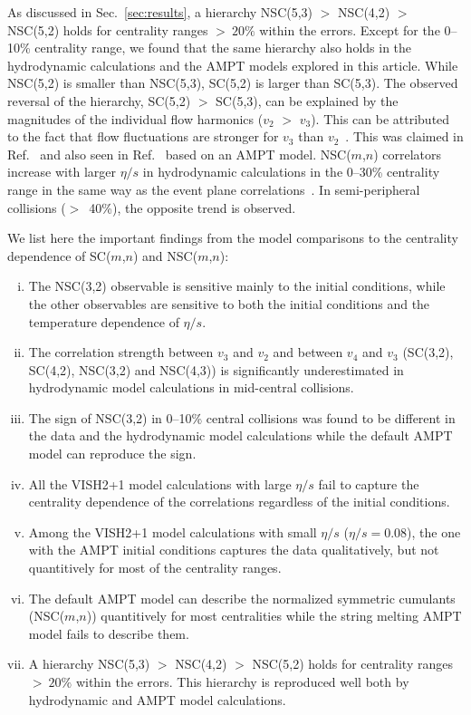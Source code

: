 As discussed in Sec.~\ref{sec:results}, a hierarchy NSC(5,3) $>$ NSC(4,2) $>$ NSC(5,2) holds for centrality ranges $>~20\%$ within the errors.
Except for the 0--10\% centrality range, we found that the same hierarchy also holds in the hydrodynamic calculations and the AMPT models explored in this article.
While NSC(5,2) is smaller than NSC(5,3), SC(5,2) is larger than SC(5,3).
The observed reversal of the hierarchy, SC(5,2) $>$ SC(5,3), can be explained by the magnitudes of the individual flow harmonics ($v_2$ $>$ $v_3$). 
This can be attributed to the fact that flow fluctuations are stronger for $v_3$ than $v_2$~\cite{Aad:2013xma}. This was claimed in Ref.~\cite{Zhu:2016puf} and also seen in Ref.~\cite{Bhalerao:2014xra} based on an AMPT model. 
NSC($m$,$n$) correlators increase with larger $\eta/s$ in hydrodynamic calculations in the 0--30\% centrality range in the same way as the event plane correlations~\cite{Bhalerao:2013ina,Teaney:2013dta}. In semi-peripheral collisions ($>$~40\%), the opposite trend is observed.

We list here the important findings from the model comparisons to the centrality dependence of SC($m$,$n$) and NSC($m$,$n$):
\begin{enumerate}[(i)]
	\item The NSC(3,2) observable is sensitive mainly to the initial conditions, while the other observables are sensitive to both the initial conditions and the temperature dependence of $\eta/s$.
	\item The correlation strength between $v_3$ and $v_2$ and between $v_4$ and $v_3$ (SC(3,2), SC(4,2), NSC(3,2) and NSC(4,3)) is significantly underestimated in hydrodynamic model calculations in mid-central collisions.
	\item The sign of NSC(3,2) in 0--10\% central collisions was found to be different in the data and the hydrodynamic model calculations while the default AMPT model can reproduce the sign.
	\item All the VISH2+1 model calculations with large $\eta/s$ fail to capture the centrality dependence of the correlations regardless of the initial conditions.
	\item Among the VISH2+1 model calculations with small $\eta/s$ ($\eta/s=0.08$), the one with the AMPT initial conditions captures the data qualitatively, but not quantitively for most of the centrality ranges.
	\item The default AMPT model can describe the normalized symmetric cumulants (NSC($m$,$n$)) quantitively for most centralities while the string melting AMPT model fails to describe them.
	\item A hierarchy NSC(5,3) $>$ NSC(4,2) $>$ NSC(5,2) holds for centrality ranges $>~20\%$ within the errors. This hierarchy is reproduced well both by hydrodynamic and AMPT model calculations.

\end{enumerate}


